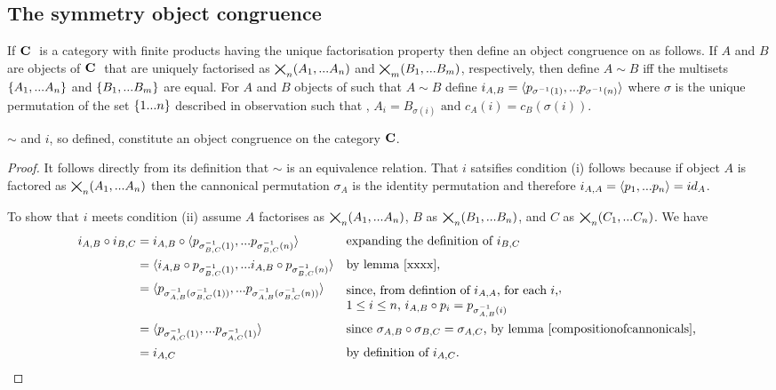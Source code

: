 \documentclass[10pt,a4paper]{scrartcl}
\begin{document}
\subsection{The symmetry object congruence}

If $\textbf{C}\ $ is a category with finite products having the unique factorisation property then define an object congruence on \catcw as follows.
If $A$ and $B$ are objects of $\textbf{C}\ $ that are uniquely factorised as $\bigtimes_{n}(A_1,...A_n)$ and $\bigtimes_{m}(B_1,...B_m)$, respectively, then define
$A \sim B$ iff the multisets $\left\{A_1,...A_n\right\}$ and $\left\{B_1,...B_m\right\}$ are equal. 
For $A$ and $B$ objects of \catcw such that $A\sim B$ define $i_{A,B}=\langle p_{\sigma^{-1}(1)},...p_{\sigma^{-1}(n)}\rangle$ where $\sigma$ is the unique permutation of the set $\left\{1...n\right\}$ described in observation 
such that \foreachi, $A_i=B_{\sigma(i)} \mbox{ and }  c_A(i) = c_B(\sigma(i))$.  

\begin{lemma}
$\sim$ and $i$, so defined, constitute an object congruence on the category $\textbf{C}$.
\end{lemma}
\begin{proof}
It follows directly from its definition that $\sim$ is an equivalence relation.
That $i$ satsifies condition (i) follows because if object $A$ is factored as $\bigtimes_{n}(A_1,...A_n)$
then the cannonical permutation $\sigma_A$ is the identity permutation and therefore 
$i_{A,A}=\langle p_1,...p_n\rangle=id_A$.

To show that $i$ meets condition (ii) assume $A$ factorises as $\bigtimes_{n}(A_1,...A_n)$,
$B$ as  
$\bigtimes_{n}(B_1,...B_n)$, 
and $C$ as $\bigtimes_{n}(C_1,...C_n)$. 
We have
\begin{align*}
i_{A,B} \circ i_{B,C} 
   & = i_{A,B}
				     \circ 
            \tuple {p_{\sigma_{B,C}^{-1}(1)},...p_{\sigma_{B,C}^{-1}(n)}}
						        && \mbox{expanding the definition of $i_{B,C}$ }\\
	 & = \tuple{i_{A,B} \circ p_{\sigma_{B,C}^{-1}(1)},...i_{A,B} \circ p_{\sigma_{B,C}^{-1}(n)}}                    && \mbox{by lemma \ref{xxxx}},\\
	 & = \tuple {p_{\sigma_{A,B}^{-1}(\sigma_{B,C}^{-1}(1))},...
					                                       p_{\sigma_{A,B}^{-1}(\sigma_{B,C}^{-1}(n))}}
										&& \mbox{\raisebox{-10pt}{\parbox{6cm}{since, from defintion of $i_{A,A}$, \foreachi, $i_{A,B} \circ p_i = p_{\sigma_{A,B}^{-1}(i)}$}}}, \\
   & = \tuple {p_{\sigma_{A,C}^{-1}(1)},...p_{\sigma_{A,C}^{-1}(1)}}
                  && \mbox{since $\sigma_{A,B} \circ \sigma_{B,C}  = \sigma_{A,C}$, by lemma \ref{compositionofcannonicals}, } \\
	 & = i_{A,C}      && \mbox{by definition of $i_{A,C}$}.	
\end{align*}                     
\end{proof}
\end{document}
